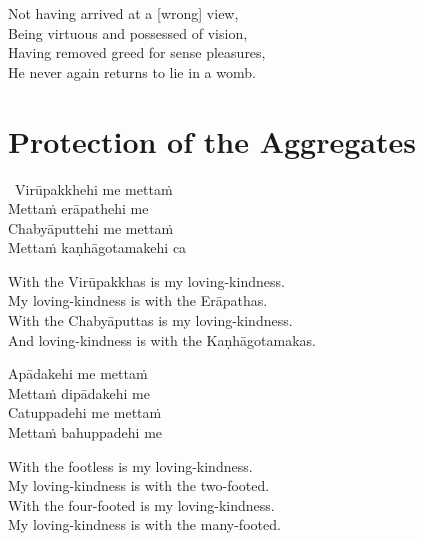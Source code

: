 \begin{english-verses}
  Not having arrived at a [wrong] view,\\
  Being virtuous and possessed of vision,\\
  Having removed greed for sense pleasures,\\
  He never again returns to lie in a womb.
\end{english-verses}

\suttaRef{[Snp 1.8]}



\section{Protection of the Aggregates}
\label{protection-of-aggregates}

\begin{pali-hang-together}
  \anglebracketleft\ \hspace{-0.5mm}Virūpakkhehi me mettaṁ \hspace{-0.5mm}\anglebracketright\ \\
  Mettaṁ erāpathehi me\\
  Chabyāputtehi me mettaṁ\\
  Mettaṁ kaṇhāgotamakehi ca
\end{pali-hang-together}

\begin{english-verses}
  With the Virūpakkhas is my loving-kindness.\\
  My loving-kindness is with the Erāpathas.\\
  With the Chabyāputtas is my loving-kindness.\\
  And loving-kindness is with the Kaṇhāgotamakas.
\end{english-verses}

\begin{pali-hang-continued}
  Apādakehi me mettaṁ\\
  Mettaṁ dipādakehi me\\
  Catuppadehi me mettaṁ\\
  Mettaṁ bahuppadehi me
\end{pali-hang-continued}

\begin{english-verses}
  With the footless is my loving-kindness.\\
  My loving-kindness is with the two-footed.\\
  With the four-footed is my loving-kindness.\\
  My loving-kindness is with the many-footed.
\end{english-verses}

